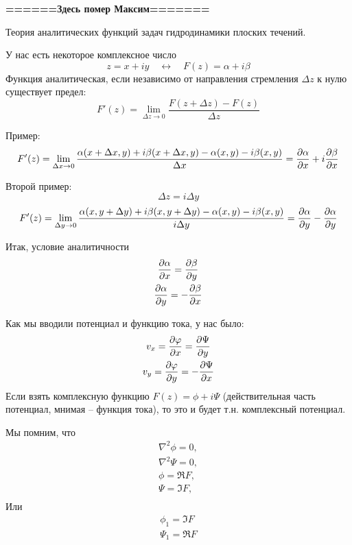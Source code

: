 \begin{center}
	\textbf{======Здесь помер Максим=======}
\end{center}
Теория аналитических функций задач гидродинамики плоских течений.

У нас есть некоторое комплексное число
\begin{equation}
	z=x+iy 
	\quad \leftrightarrow \quad
	F(z)=\alpha+i \beta
\end{equation}
Функция аналитическая, если независимо от направления стремления $\Delta z$ к нулю существует предел:
\begin{equation}
	F'(z)=\lim\limits_{\Delta z\to0}\frac{F(z+\Delta z)-F(z)}{\Delta z}
\end{equation}

Пример:
\begin{equation}
	F'(z)=\lim\limits_{\Delta x\to0}\frac{\alpha(x+\Delta x,y)+i\beta(x+\Delta x,y)-\alpha(x,y)-i\beta(x,y)}{\Delta x}=
		\pdv{\alpha}{x}+i\pdv{\beta}{x}
\end{equation}

Второй пример:
\begin{equation}
	\Delta z=i\Delta y
\end{equation}
\begin{equation}
	F'(z)=\lim\limits_{\Delta y\to0}\frac{\alpha(x,y+\Delta y)+i\beta(x,y+\Delta y)-\alpha(x,y)-i\beta(x,y)}{i\Delta y}=
		\pdv{\alpha}{y}-\pdv{\alpha}{y}
\end{equation}

Итак, условие аналитичности
\begin{gather}
	\label{eq2}
	\pdv{\alpha}{x}=\pdv{\beta}{y}\\
	\pdv{\alpha}{y}=-\pdv{\beta}{x}
\end{gather}

Как мы вводили потенциал и функцию тока, у нас было:
\begin{gather}
	\label{eq3}
	v_x=\pdv{\varphi}{x}=\pdv{\Psi}{y}\\
	v_y=\pdv{\varphi}{y}=-\pdv{\Psi}{x}
\end{gather}
Если взять комплексную функцию $F(z)=\phi+i\Psi$ (действительная часть потенциал, мнимая --  функция тока), то это и будет т.н. комплексный потенциал.

Мы помним, что
\begin{gather}
	\nabla^2\phi=0,\\
	\nabla^2\Psi=0,\\
	\phi=\Re{F},\\
	\Psi=\Im{F},\\
\end{gather}
Или
\begin{gather}
	\label{eq444}
	\phi_1=\Im{F}\\
	\Psi_1=\Re{F}
\end{gather}

